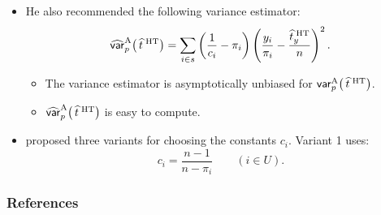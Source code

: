\documentclass{my_eth_beamer}
\numberwithin{equation}{section}
\begin{document}
\begin{frame}
    \begin{itemize}
    \setlength{\itemsep}{12pt}
        \item He also recommended the following \alert{variance estimator}:
            \begin{equation*}
                \widehat{\mathsf{var}}_p^{\mathrm{A}}\big(\,\widehat{t}^{\;\mathrm{HT}}\big) = \sum_{i \in s}
                    \left(\frac{1}{c_i} - \pi_i\right)
                    \left(\frac{y_i}{\pi_i} - \frac{\widehat{t}^{\;\mathrm{HT}}_y}{n} \right)^2.
            \end{equation*}
            \begin{itemize}
            \setlength{\itemsep}{6pt}
                \item The variance estimator is asymptotically unbiased for
                    $\mathsf{var}_p^{\mathrm{A}}\big(\,\widehat{t}^{\;\mathrm{HT}}\big)$.
                \item $\widehat{\mathsf{var}}_p^{\mathrm{A}}\big(\,\widehat{t}^{\;\mathrm{HT}}\big)$ is easy
                    to compute.
            \end{itemize}
        \item \citet{brewer_2000} proposed \alert{three variants} for choosing
            the \alert{constants} $c_i$. Variant 1 uses:
                \begin{equation*}
                    c_i  = \frac{n - 1}{n - \pi_i} \qquad (i \in U).
                \end{equation*}
    \end{itemize}
\end{frame}

\setcounter{section}{\the\numexpr\value{section}-1\relax}
\begin{frame}[allowframebreaks]
    \frametitle{References}
    {\footnotesize
        
        
    }
\end{frame}

\lastpage
\end{document}
